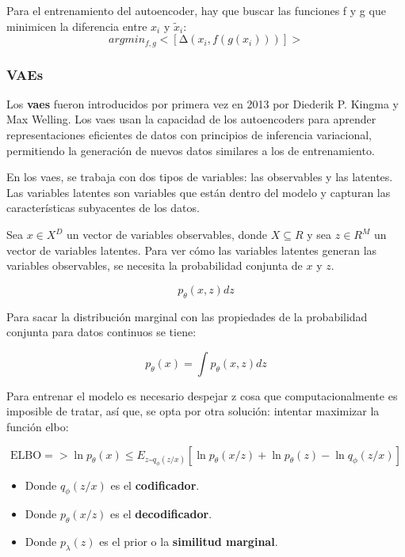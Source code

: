 Para el entrenamiento del autoencoder, hay que buscar las funciones f y g que minimicen la diferencia entre $x_i$ y $\tilde{x}_i$:
\begin{equation}
	argmin_{f,g} <[∆(x_i,f(g(x_i)))]> \label{eq:autoencoder3}
\end{equation}

\subsubsection{VAEs}
\quad Los \textbf{\glspl{vae}} fueron introducidos por primera vez en 2013 por Diederik P. Kingma y Max Welling\cite{vae}. Los \glspl{vae} usan la capacidad de los autoencoders para aprender representaciones eficientes de datos con principios de inferencia variacional, permitiendo la generación de nuevos datos similares a los de entrenamiento.

En los \glspl{vae}, se trabaja con dos tipos de variables: las observables y las latentes. Las variables latentes son variables que están dentro del modelo y capturan las características subyacentes de los datos.

Sea $x\in X^D$ un vector de variables observables, donde $X \subseteq R$ y sea $z\in R^M$ un vector de variables latentes. Para ver cómo las variables latentes generan las variables observables, se necesita la probabilidad conjunta de $x$ y $z$.

\begin{equation}
	p_\theta(x,z)dz \label{eq:vae1}
\end{equation}

Para sacar la distribución marginal con las propiedades de la probabilidad conjunta para datos continuos se tiene\cite{vae,vae2}: 

\begin{equation}
	p_\theta(x)=\int {p_\theta(x,z)dz} \label{eq:vae2}
\end{equation}

Para entrenar el modelo es necesario despejar z cosa que computacionalmente es imposible de tratar, así que, se opta por otra solución: intentar maximizar la función \gls{elbo}\cite{vae,vae2}:

\begin{equation}
\text{ELBO} => \ln{p_\theta(x)} \le E_{z\text{\textasciitilde}q_\phi(z/x)}[\ln{p_\theta(x/z)} + \ln{p_\theta(z)} - \ln{q_\phi(z/x)}] \label{eq:elbo}
\end{equation}

\begin{itemize}
	\item Donde $q_\phi(z/x)$ es el \textbf{codificador}.
	\item Donde $p_\theta(x/z)$ es el \textbf{decodificador}.
	\item Donde $p_\lambda(z)$ es el prior o la \textbf{similitud marginal}.
\end{itemize}

